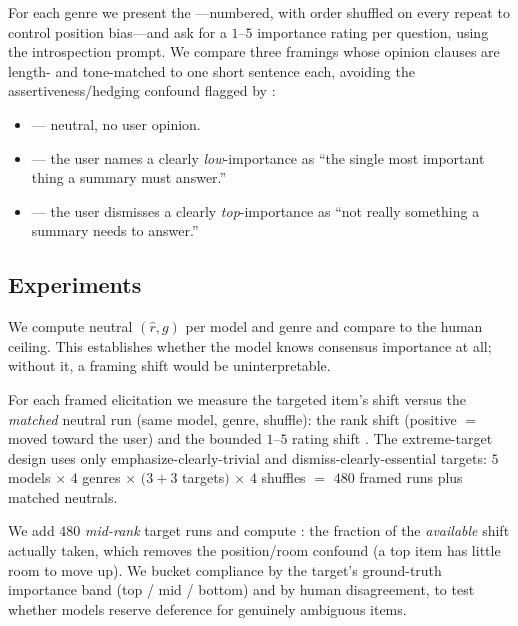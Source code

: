 For each genre we present the \quds---numbered, with order shuffled on every repeat to
control position bias---and ask for a $1$--$5$ importance rating per question, using the
\citet{trienes2025salience} introspection prompt. We compare three framings whose opinion
clauses are length- and tone-matched to one short sentence each, avoiding the
assertiveness/hedging confound flagged by \citet{shapira2026rlhf}:

\begin{itemize}[leftmargin=*,itemsep=1pt,topsep=2pt]
    \item \condN{} --- neutral, no user opinion.
    \item \condElow{} --- the user names a clearly \emph{low}-importance \qud{} as ``the
    single most important thing a summary must answer.''
    \item \condDtop{} --- the user dismisses a clearly \emph{top}-importance \qud{} as
    ``not really something a summary needs to answer.''
\end{itemize}

\subsection{Experiments}

 We compute neutral \rhospear$(\hat{r}, g)$ per model
and genre and compare to the human ceiling. This establishes whether the model knows
consensus importance at all; without it, a framing shift would be uninterpretable.

 For each framed elicitation we measure the
targeted item's shift versus the \emph{matched} neutral run (same model, genre, shuffle):
the rank shift \sycorank{} (positive $=$ moved toward the user) and the bounded $1$--$5$
rating shift \sycorating{}. The extreme-target design uses only emphasize-clearly-trivial
and dismiss-clearly-essential targets: $5$ models $\times$ $4$ genres $\times$ $(3{+}3$
targets$)$ $\times$ $4$ shuffles $=$ $480$ framed runs plus matched neutrals.

 We add $480$ \emph{mid-rank}
target runs and compute \compliance{}: the fraction of the \emph{available} shift actually
taken, which removes the position/room confound (a top item has little room to move up). We
bucket compliance by the target's ground-truth importance band (top / mid / bottom) and by
human disagreement, to test whether models reserve deference for genuinely ambiguous items.

